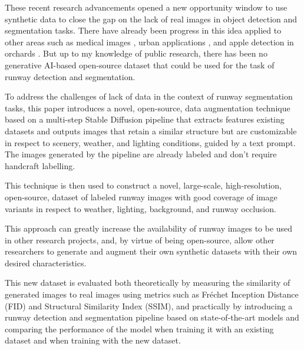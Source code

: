 These recent research advancements opened a new opportunity window to use synthetic data to close the gap on the lack of real images in object detection and segmentation tasks. There have already been progress in this idea applied to other areas such as medical images \cite{saragih_using_2024}, urban applications \cite{reutov_generating_2023}, and apple detection in orchards \cite{voetman_big_2023}. But up to my knowledge of public research, there has been no generative AI-based open-source dataset that could be used for the task of runway detection and segmentation.

To address the challenges of lack of data in the context of runway segmentation tasks, this paper introduces a novel, open-source, data augmentation technique based on a multi-step Stable Diffusion pipeline that extracts features existing datasets and outputs images that retain a similar structure but are customizable in respect to scenery, weather, and lighting conditions, guided by a text prompt. The images generated by the pipeline are already labeled and don't require handcraft labelling.

This technique is then used to construct a novel, large-scale, high-resolution, open-source, dataset of labeled runway images with good coverage of image variants in respect to weather, lighting, background, and runway occlusion.

This approach can greatly increase the availability of runway images to be used in other research projects, and, by virtue of being open-source, allow other researchers to generate and augment their own synthetic datasets with their own desired characteristics.

This new dataset is evaluated both theoretically by measuring the similarity of generated images to real images using metrics such as Fréchet Inception Distance (FID) and Structural Similarity Index (SSIM), and practically by introducing a runway detection and segmentation pipeline based on state-of-the-art models and comparing the performance of the model when training it with an existing dataset and when training with the new dataset.
